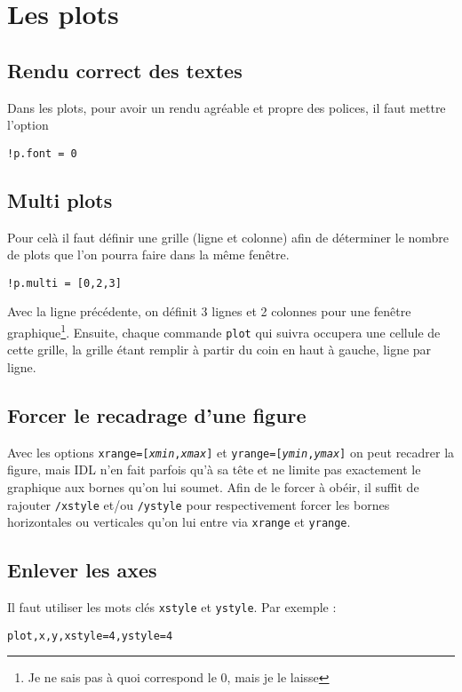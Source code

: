 \documentclass[a4paper,twoside]{article}
\begin{document}
\section{Les plots}
\subsection{Rendu correct des textes}\label{sec:rendu_texte}
Dans les plots, pour avoir un rendu agréable et propre des polices, il faut mettre l'option
\begin{lstlisting}[language=IDL]
!p.font = 0
\end{lstlisting}

\subsection{Multi plots}
Pour celà il faut définir une grille (ligne et colonne) afin de déterminer le nombre de plots que l'on pourra faire dans la même fenêtre.
\begin{lstlisting}[language=IDL]
!p.multi = [0,2,3]
\end{lstlisting}

Avec la ligne précédente, on définit 3 lignes et 2 colonnes pour une fenêtre graphique\footnote{Je ne sais pas à quoi correspond le 0, mais je le laisse}. Ensuite, chaque commande \texttt{plot} qui suivra occupera une cellule de cette grille, la grille étant remplir à partir du coin en haut à gauche, ligne par ligne.

\subsection{Forcer le recadrage d'une figure}
Avec les options \texttt{xrange=[\emph{xmin},\emph{xmax}]} et \texttt{yrange=[\emph{ymin},\emph{ymax}]} on peut recadrer la figure, mais IDL n'en fait parfois qu'à sa tête et ne limite pas exactement le graphique aux bornes qu'on lui soumet. Afin de le forcer à obéir, il suffit de rajouter \texttt{/xstyle} et/ou \texttt{/ystyle} pour respectivement forcer les bornes horizontales ou verticales qu'on lui entre via \texttt{xrange} et \texttt{yrange}.

\subsection{Enlever les axes}
Il faut utiliser les mots clés \verb|xstyle| et \verb|ystyle|. Par exemple :
\begin{lstlisting}[language=IDL]
plot,x,y,xstyle=4,ystyle=4
\end{lstlisting}
\end{document}
